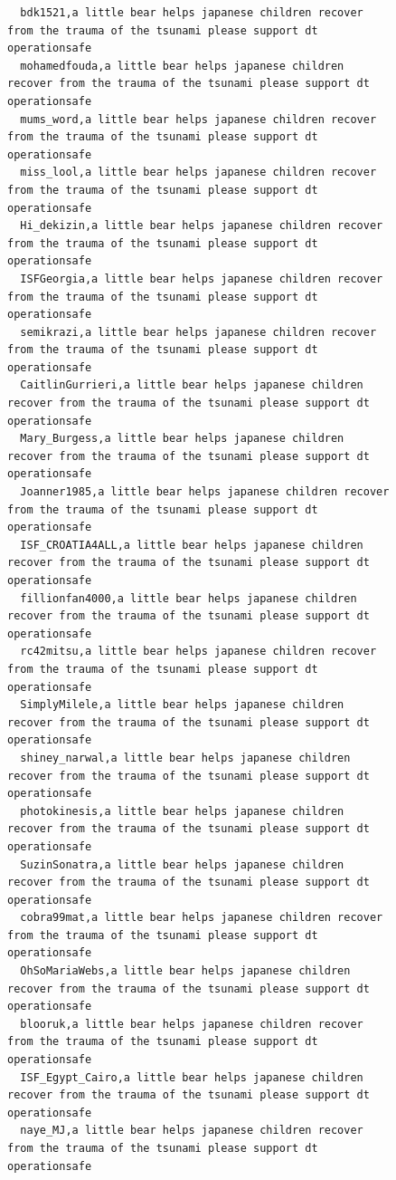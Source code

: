 \begin{figure}[htpb]
\begin{verbatim}
  bdk1521,a little bear helps japanese children recover from the trauma of the tsunami please support dt operationsafe
  mohamedfouda,a little bear helps japanese children recover from the trauma of the tsunami please support dt operationsafe
  mums_word,a little bear helps japanese children recover from the trauma of the tsunami please support dt operationsafe
  miss_lool,a little bear helps japanese children recover from the trauma of the tsunami please support dt operationsafe
  Hi_dekizin,a little bear helps japanese children recover from the trauma of the tsunami please support dt operationsafe
  ISFGeorgia,a little bear helps japanese children recover from the trauma of the tsunami please support dt operationsafe
  semikrazi,a little bear helps japanese children recover from the trauma of the tsunami please support dt operationsafe
  CaitlinGurrieri,a little bear helps japanese children recover from the trauma of the tsunami please support dt operationsafe
  Mary_Burgess,a little bear helps japanese children recover from the trauma of the tsunami please support dt operationsafe
  Joanner1985,a little bear helps japanese children recover from the trauma of the tsunami please support dt operationsafe
  ISF_CROATIA4ALL,a little bear helps japanese children recover from the trauma of the tsunami please support dt operationsafe
  fillionfan4000,a little bear helps japanese children recover from the trauma of the tsunami please support dt operationsafe
  rc42mitsu,a little bear helps japanese children recover from the trauma of the tsunami please support dt operationsafe
  SimplyMilele,a little bear helps japanese children recover from the trauma of the tsunami please support dt operationsafe
  shiney_narwal,a little bear helps japanese children recover from the trauma of the tsunami please support dt operationsafe
  photokinesis,a little bear helps japanese children recover from the trauma of the tsunami please support dt operationsafe
  SuzinSonatra,a little bear helps japanese children recover from the trauma of the tsunami please support dt operationsafe
  cobra99mat,a little bear helps japanese children recover from the trauma of the tsunami please support dt operationsafe
  OhSoMariaWebs,a little bear helps japanese children recover from the trauma of the tsunami please support dt operationsafe
  blooruk,a little bear helps japanese children recover from the trauma of the tsunami please support dt operationsafe
  ISF_Egypt_Cairo,a little bear helps japanese children recover from the trauma of the tsunami please support dt operationsafe
  naye_MJ,a little bear helps japanese children recover from the trauma of the tsunami please support dt operationsafe

\end{verbatim}
\end{figure}
